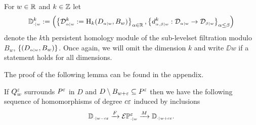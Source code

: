 

For $w\in\R$ and $k\in\Z$ let
\[ \DD{w}^k := \left(\left\{\D{w}{\alpha}^k := \hom_k(D\subi{w}{\alpha},B_w)\right\}_{\alpha\in\R},\left\{d\subi{w}{\alpha,\beta}^k : \D{w}{\alpha}\to\D{w}{\beta}\right\}_{\alpha\leq\beta}\right)\]
denote the $k$th persistent homology module of the sub-levelset filtration modulo $B_w$, $\{(D\subi{w}{\alpha},B_w)\}$.
Once again, we will omit the dimension $k$ and write $\DD{w}$ if a statement holds for all dimensions.

The proof of the following lemma can be found in the appendix.

\begin{lemma}\label{lem:p_interleave}
 If $Q_w^\e$ surrounds $P^\e$ in $D$ and $D\setminus B_{w + \e}\subseteq P^\e$ then we have the following sequence of homomorphisms of degree $c\e$ induced by inclusions
 \[\DD{w-c\e}\xrightarrow{F}\E\PP{w}{\e}\xrightarrow{M}\DD{w+c\e}.\]
\end{lemma}
%
%

